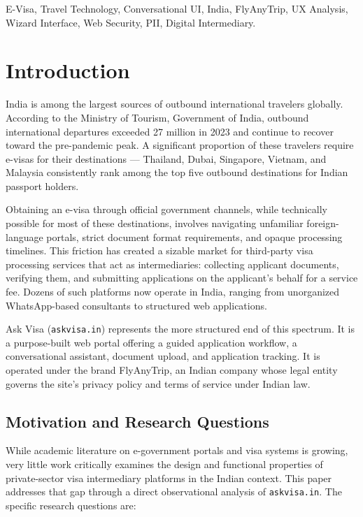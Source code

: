\documentclass[journal, 10pt, twoside]{IEEEtran}
\begin{document}
\begin{IEEEkeywords}
E-Visa, Travel Technology, Conversational UI, India, FlyAnyTrip,
UX Analysis, Wizard Interface, Web Security, PII, Digital Intermediary.
\end{IEEEkeywords}

\section{Introduction}
\label{sec:introduction}

India is among the largest sources of outbound international travelers
globally. According to the Ministry of Tourism, Government of India,
outbound international departures exceeded 27 million in 2023 and continue
to recover toward the pre-pandemic peak. A significant proportion of these
travelers require e-visas for their destinations --- Thailand, Dubai,
Singapore, Vietnam, and Malaysia consistently rank among the top five
outbound destinations for Indian passport holders.

Obtaining an e-visa through official government channels, while technically
possible for most of these destinations, involves navigating unfamiliar
foreign-language portals, strict document format requirements, and opaque
processing timelines. This friction has created a sizable market for
third-party visa processing services that act as intermediaries: collecting
applicant documents, verifying them, and submitting applications on the
applicant's behalf for a service fee. Dozens of such platforms now operate
in India, ranging from unorganized WhatsApp-based consultants to structured
web applications.

Ask Visa (\texttt{askvisa.in}) represents the more structured end of this
spectrum. It is a purpose-built web portal offering a guided application
workflow, a conversational assistant, document upload, and application
tracking. It is operated under the brand FlyAnyTrip, an Indian company
whose legal entity governs the site's privacy policy and terms of service
under Indian law.

\subsection{Motivation and Research Questions}
\label{subsec:motivation}
While academic literature on e-government portals and visa systems is
growing, very little work critically examines the design and functional
properties of private-sector visa intermediary platforms in the Indian
context. This paper addresses that gap through a direct observational
analysis of \texttt{askvisa.in}. The specific research questions are:
\end{document}
